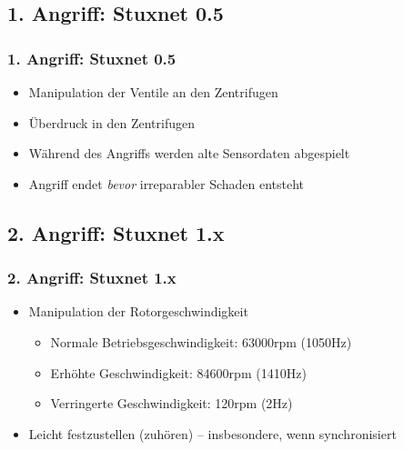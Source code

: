 \documentclass{beamer}
\begin{document}
\subsection{1. Angriff: Stuxnet 0.5}

\begin{frame}
  \frametitle{1. Angriff: Stuxnet 0.5}
  \begin{itemize}
    \item Manipulation der Ventile an den Zentrifugen
    \item Überdruck in den Zentrifugen
    \item Während des Angriffs werden alte Sensordaten abgespielt
    \item Angriff endet \emph{bevor} irreparabler Schaden entsteht
  \end{itemize}
\end{frame}

\subsection{2. Angriff: Stuxnet 1.x}

\begin{frame}
  \frametitle{2. Angriff: Stuxnet 1.x}
  \begin{itemize}
    \item Manipulation der Rotorgeschwindigkeit
      \begin{itemize}
        \item Normale Betriebsgeschwindigkeit: 63000rpm (1050Hz)
        \item Erhöhte Geschwindigkeit: 84600rpm (1410Hz)
        \item Verringerte Geschwindigkeit: 120rpm (2Hz)
      \end{itemize}
    \item Leicht festzustellen (zuhören) – insbesondere, wenn synchronisiert
  \end{itemize}
\end{frame}
\end{document}
